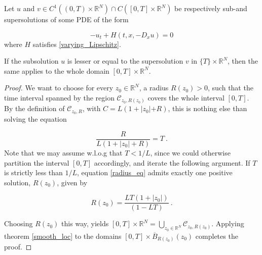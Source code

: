 \begin{corollary}
			\label{Smooth Uniqueness}
			Let $ u $ and $ v \in C^{1}(\left(0, T \right) \times \mathbb{R}^N) \cap C(\left[ 0, T \right] \times \mathbb{R}^{N}) $ be respectively sub-and supersolutions of some PDE of the form
			
			\begin{equation*}
				-u_t + H(t, x, -D_x u) = 0
			\end{equation*}
			where $ H $ satisfies \eqref{varying_Lipschitz}.
			
			If the subsolution $ u $ is lesser or equal to the supersolution $ v $ in $ \{ T \} \times \mathbb{R}^{N} $, then the same applies to the whole domain $ \left[ 0, T \right] \times \mathbb{R}^{N} $.
			
			\begin{proof}
				We want to choose for every $ z_0 \in \mathbb{R}^{N} $, a radius $ R(z_0) > 0 $, such that the time interval spanned by the region $ \mathcal{C}_{z_0, R(z_0)} $ covers the whole interval $ \left[0, T \right] $. By the definition of $ \mathcal{C}_{z_0, R} $, with $ C = L (1 + \lvert z_0 \lvert + R) $, this is nothing else than solving the equation
				
				\begin{equation}
				\label{radius_eq}
					\frac{R}{L(1 + |z_0| + R)} = T \ .
				\end{equation}
				Note that we may assume w.l.o.g that $ T < 1 / L $, since we could otherwise partition the interval $ \left[ 0, T \right] $ accordingly, and iterate the following argument.
				If $ T $ is strictly less than $ 1 / L $, equation \eqref{radius_eq} admits exactly one positive solution, $ R(z_0) $, given by
				
				\begin{equation*}
					R(z_0) = \frac{LT(1 + \lvert z_0 \rvert)}{(1 - LT)} \ .
				\end{equation*}
				
				Choosing $ R(z_0) $ this way, yields $ \left[0, T\right] \times \mathbb{R}^{N} = \bigcup\limits_{z_0 \in \mathbb{R}^{N}} \mathcal{C}_{z_0, R(z_0)} $. Applying theorem \ref{smooth_loc} to the domains $ \left[ 0, T \right] \times \overline{B}_{R(z_0)}(z_0)$ completes the proof.
			\end{proof}
		\end{corollary}